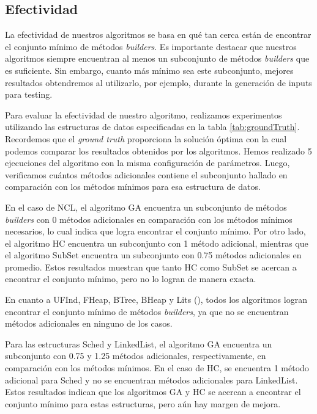 

\subsection{Efectividad}

La efectividad de nuestros algoritmos se basa en qué tan cerca están de encontrar el conjunto mínimo de métodos \emph{builders}. Es importante destacar que nuestros algoritmos siempre encuentran al menos un subconjunto de métodos \emph{builders} que es suficiente. Sin embargo, cuanto más mínimo sea este subconjunto, mejores resultados obtendremos al utilizarlo, por ejemplo, durante la generación de inputs para testing.

Para evaluar la efectividad de nuestro algoritmo, realizamos experimentos utilizando las estructuras de datos especificadas en la tabla \ref{tab:groundTruth}. Recordemos que el \emph{ground truth} proporciona la solución óptima con la cual podemos comparar los resultados obtenidos por los algoritmos. Hemos realizado 5 ejecuciones del algoritmo con la misma configuración de parámetros. Luego, verificamos cuántos métodos adicionales contiene el subconjunto hallado en comparación con los métodos mínimos para esa estructura de datos.

En el caso de NCL, el algoritmo GA encuentra un subconjunto de métodos \emph{builders} con 0 métodos adicionales en comparación con los métodos mínimos necesarios, lo cual indica que logra encontrar el conjunto mínimo. Por otro lado, el algoritmo HC encuentra un subconjunto con 1 método adicional, mientras que el algoritmo SubSet encuentra un subconjunto con 0.75 métodos adicionales en promedio. Estos resultados muestran que tanto HC como SubSet se acercan a encontrar el conjunto mínimo, pero no lo logran de manera exacta.

En cuanto a UFInd, FHeap, BTree, BHeap y Lits (), todos los algoritmos logran encontrar el conjunto mínimo de métodos \emph{builders}, ya que no se encuentran métodos adicionales en ninguno de los casos.

Para las estructuras Sched y LinkedList, el algoritmo GA encuentra un subconjunto con 0.75 y 1.25 métodos adicionales, respectivamente, en comparación con los métodos mínimos. En el caso de HC, se encuentra 1 método adicional para Sched y no se encuentran métodos adicionales para LinkedList. Estos resultados indican que los algoritmos GA y HC se acercan a encontrar el conjunto mínimo para estas estructuras, pero aún hay margen de mejora.

